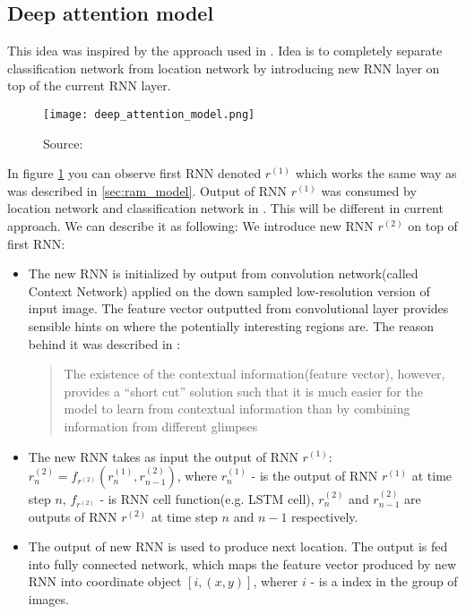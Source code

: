 {\subsection{Deep attention model}
\label{subs:deep_att_model}
This idea was inspired by the approach used in \cite{DBLP:journals/corr/BaMK14}.
Idea is to completely separate classification network from location network
by introducing new RNN layer on top of the current RNN layer.

\begin{figure}
	\texttt{[image: deep\_attention\_model.png]}
	\caption{Source: \cite{DBLP:journals/corr/BaMK14}}
	\label{fig:deep_att_model}
\end{figure}

In figure \ref{fig:deep_att_model} you can observe first RNN denoted $r^{(1)}$ which works
the same way as was described in \autoref{sec:ram_model}. Output of RNN $r^{(1)}$
was consumed by location network and classification network in \cite{DBLP:journals/corr/MnihHGK14}.
This will be different in current approach. We can describe it as following:
We introduce new RNN $r^{(2)}$ on top of first RNN:
\begin{itemize}
	\item The new RNN is initialized by output from convolution
		network(called Context Network) applied on the down
		sampled low-resolution version of input image.
		The feature vector outputted from convolutional layer
		provides sensible hints on where
		the potentially interesting regions are.
		The reason behind it was described in \cite{DBLP:journals/corr/BaMK14}:
		\blockquote{The existence of the contextual information(feature vector),
		however, provides a
		“short cut” solution such that it is much easier for the model to
		learn from contextual information than by combining information
		from different glimpses}
	\item The new RNN takes as input the output of RNN $r^{(1)}$:
		$r_n^{(2)} = f_{r^{(2)}}(r_n^{(1)}, r_{n-1}^{(2)})$,
		where $r_n^{(1)}$ - is the output of RNN $r^{(1)}$ at time step $n$,
		$f_{r^{(2)}}$ - is RNN cell function(e.g. LSTM cell),
		  $r_n^{(2)}$ and $r_{n-1}^{(2)}$ are outputs of RNN $r^{(2)}$
		  at time step $n$ and $n-1$ respectively.
	\item The output of new RNN is used to produce next location.
		The output is fed into fully connected network, which maps
		the feature vector produced by new RNN into coordinate object $[i, (x,y)]$,
		wherer $i$ - is a index in the group of images.
\end{itemize}

}

